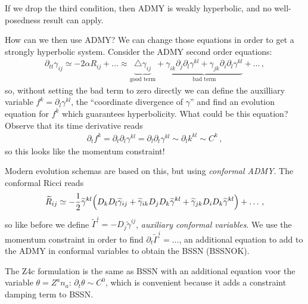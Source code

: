 \documentclass[main.tex]{subfiles}
\begin{document}
If we drop the third condition, then ADMY is weakly hyperbolic, and no well-posedness result can apply. 

How can we then use ADMY? We can change those equations in order to get a strongly hyperbolic system. 
Consider the ADMY second order equations: 
%
\begin{align}
\partial_{tt} \gamma_{ij} \simeq - 2 \alpha  R_{ij} + \dots \approx \underbrace{\triangle \gamma_{ij}}_{\text{good term}} + \underbrace{\gamma_{ik} \partial_{j} \partial_{l} \gamma^{kl} + \gamma_{jk} \partial_{i} \partial_{l} \gamma^{kl}}_{\text{bad term}}  + \dots
\,,
\end{align}
%
so, without setting the bad term to zero directly we can define the auxilliary variable \(f^{k} = \partial_{l} \gamma^{kl}\), the ``coordinate divergence of \(\gamma \)'' and find an evolution equation for \(f^{k}\) which guarantees hyperbolicity. 
What could be this equation? 
Observe that its time derivative reads 
%
\begin{align}
\partial_{t} f^{k} = \partial_{t} \partial_{l} \gamma^{kl} = \partial_{l} \partial_{t} \gamma^{kl} \sim \partial_{l} k^{kl}  \sim C^{k}
\,,
\end{align}
%
so this looks like the momentum constraint! 

Modern evolution schemas are based on this, but using \emph{conformal ADMY}. 
The conformal Ricci reads 
%
\begin{align}
\widetilde{R}_{ij} \simeq - \frac{1}{2} \widetilde{\gamma}^{kl} \qty(
D_k D_l \widetilde{\gamma}_{ij} + \widetilde{\gamma}_{ik} D_j D_k \widetilde{\gamma}^{kl} + \widetilde{\gamma}_{jk} D_i D_k \widetilde{\gamma}^{kl} 
)  + \dots
\,,
\end{align}
%
so like before we define \(\widetilde{\Gamma}^{i} = - D_j \widetilde{\gamma}^{ij}\), \emph{auxiliary conformal variables}. 
We use the momentum constraint in order to find \(\partial_{t} \widetilde{\Gamma}^{i} = \dots\), an additional equation to add to the ADMY in conformal variables to obtain the BSSN (BSSNOK).

The Z4c formulation is the same as BSSN with an additional equation voor the variable \(\theta = Z^{a} n_a\): \(\partial_{t} \theta \sim C^{0}\), which is convenient because it adds a constraint damping term to BSSN.    
\end{document}
